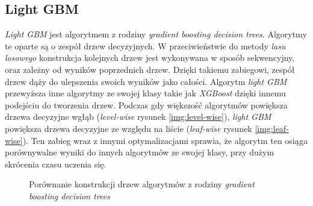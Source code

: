 \documentclass[a4paper, twoside, 11pt, openright]{article}
\begin{document}
\subsection{Light GBM}

\textit{Light GBM}\cite{lgbm} jest algorytmem z rodziny \textit{gradient boosting decision trees}. Algorytmy te oparte są o zespół drzew decyzyjnych. W przeciwieństwie do metody \textit{lasu losowego} konstrukcja kolejnych drzew jest wykonywana w sposób sekwencyjny, oraz zależny od wyników poprzednich drzew. Dzięki takiemu zabiegowi, zespół drzew dąży do ulepszenia swoich wyników jako całości. Algorytm \textit{light GBM} przewyższa inne algorytmy ze swojej klasy takie jak \textit{XGBoost} dzięki innemu podejściu do tworzenia drzew. Podczas gdy większość algorytmów powiększa drzewa decyzyjne wgłąb (\textit{level-wise}  rysunek \ref{img:level-wise}), \textit{light GBM} powiększa drzewa decyzyjne ze względu na liście (\textit{leaf-wise} rysunek \ref{img:leaf-wise}). Ten zabieg wraz z innymi optymalizacjami sprawia, że algorytm ten osiąga porównywalne wyniki do innych algorytmów ze swojej klasy, przy dużym skrócenia czasu uczenia się. 


\begin{figure}[H]%
\centering
{}%
\qquad
{}%
\caption{Porównanie konstrukcji drzew algorytmów z rodziny \textit{gradient boosting decision trees}}
\label{img:level-leaf-wise}
\end{figure}
\end{document}

